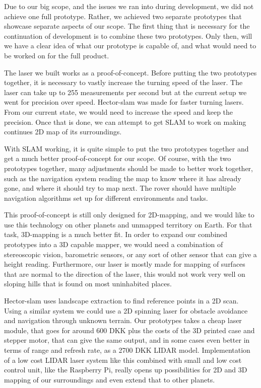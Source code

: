 Due to our big scope, and the issues we ran into during development, we did not achieve one full prototype. Rather, we achieved two separate prototypes that showcase separate aspects of our scope. The first thing that is necessary for the continuation of development is to combine these two prototypes. Only then, will we have a clear idea of what our prototype is capable of, and what would need to be worked on for the full product.

The laser we built works as a proof-of-concept. Before putting the two prototypes together, it is necessary to vastly increase the turning speed of the laser. The laser can take up to 255 measurements per second but at the current setup we went for precision over speed. Hector-slam was made for faster turning lasers. From our current state, we would need to increase the speed and keep the precision. Once that is done, we can attempt to get SLAM to work on making continues 2D map of its surroundings.

With SLAM working, it is quite simple to put the two prototypes together and get a much better proof-of-concept for our scope. Of course, with the two prototypes together, many adjustments should be made to better work together, such as the navigation system reading the map to know where it has already gone, and where it should try to map next. The rover should have multiple navigation algorithms set up for different environments and tasks. 

This proof-of-concept is still only designed for 2D-mapping, and we would like to use this technology on other planets and unmapped territory on Earth. For that task, 3D-mapping is a much better fit. In order to expand our combined prototypes into a 3D capable mapper, we would need a combination of stereoscopic vision, barometric sensors, or any sort of other sensor that can give a height reading. Furthermore, our laser is mostly made for mapping of surfaces that are normal to the direction of the laser, this would not work very well on sloping hills that is found on most uninhabited places.

Hector-slam uses landscape extraction to find reference points in a 2D scan. Using a similar system we could use a 2D spinning laser for obstacle avoidance and navigation through unknown terrain. Our prototypes takes a cheap laser module, that goes for around 600 DKK\cite{lidarl} plus the costs of the 3D printed case and stepper motor, that can give the same output, and in some cases even better in terms of range and refresh rate, as a 2700 DKK\cite{lidar360} LIDAR model. Implementation of a low cost LIDAR laser system like this combined with small and low cost control unit, like the Raspberry Pi, really opens up possibilities for 2D and 3D mapping of our surroundings and even extend that to other planets. 